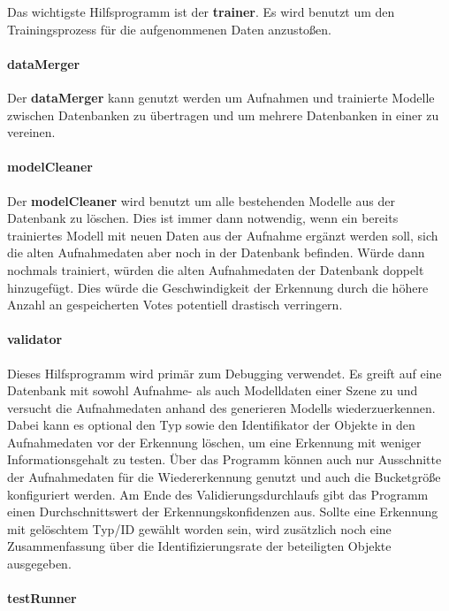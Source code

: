 Das wichtigste Hilfsprogramm ist der \textbf{trainer}.
Es wird benutzt um den Trainingsprozess für die aufgenommenen Daten anzustoßen.

\paragraph{dataMerger}

Der \textbf{dataMerger} kann genutzt werden um Aufnahmen und trainierte Modelle zwischen Datenbanken zu übertragen und um mehrere Datenbanken in einer zu vereinen.

\paragraph{modelCleaner}

Der \textbf{modelCleaner} wird benutzt um alle bestehenden Modelle aus der Datenbank zu löschen.
Dies ist immer dann notwendig, wenn ein bereits trainiertes Modell mit neuen Daten aus der Aufnahme ergänzt werden soll, sich die alten Aufnahmedaten aber noch in der Datenbank befinden.
Würde dann nochmals trainiert, würden die alten Aufnahmedaten der Datenbank doppelt hinzugefügt. Dies würde die Geschwindigkeit der Erkennung durch die höhere Anzahl an gespeicherten Votes potentiell drastisch verringern.

\paragraph{validator}

Dieses Hilfsprogramm wird primär zum Debugging verwendet.
Es greift auf eine Datenbank mit sowohl Aufnahme- als auch Modelldaten einer Szene zu und versucht die Aufnahmedaten anhand des generieren Modells wiederzuerkennen.
Dabei kann es optional den Typ sowie den Identifikator der Objekte in den Aufnahmedaten vor der Erkennung löschen, um eine Erkennung mit weniger Informationsgehalt zu testen.
Über das Programm können auch nur Ausschnitte der Aufnahmedaten für die Wiedererkennung genutzt und auch die Bucketgröße konfiguriert werden.
Am Ende des Validierungsdurchlaufs gibt das Programm einen Durchschnittswert der Erkennungskonfidenzen aus.
Sollte eine Erkennung mit gelöschtem Typ/ID gewählt worden sein, wird zusätzlich noch eine Zusammenfassung über die Identifizierungsrate der beteiligten Objekte ausgegeben.

\paragraph{testRunner}\label{impl:testrunner}

